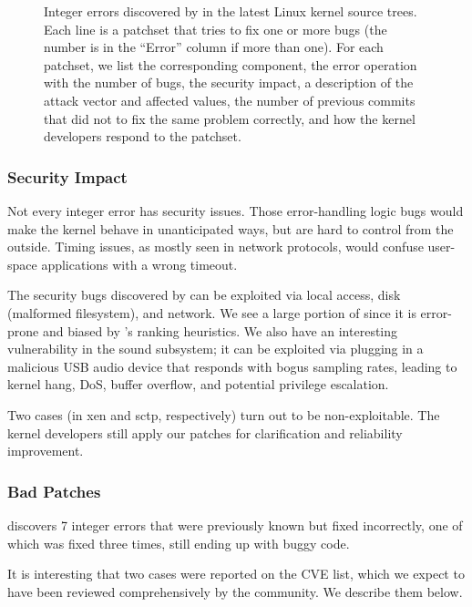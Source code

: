 \begin{figure*}
\centering
\footnotesize

\caption{Integer errors discovered by \sys in the latest Linux
kernel source trees.  Each line is a patchset that tries to fix one
or more bugs (the number is in the ``Error'' column if more than
one).  For each patchset, we list the corresponding component, the
error operation with the number of bugs, the security impact, a
description of the attack vector and affected values, the number
of previous commits that did not to fix the same problem correctly,
and how the kernel developers respond to the patchset.}
\label{f:data:linux}
\end{figure*}

\subsubsection{Security Impact}

Not every integer error has security issues.  Those error-handling
logic bugs would make the kernel behave in unanticipated ways, but
are hard to control from the outside.  Timing issues, as mostly
seen in network protocols, would confuse user-space applications
with a wrong timeout.

The security bugs discovered by \sys can be exploited via local
access, disk (malformed filesystem), and network.  We see a large
portion of  since it is error-prone and biased by \sys's
ranking heuristics.  We also have an interesting vulnerability in
the sound subsystem; it can be exploited via plugging in a malicious
USB audio device that responds with bogus sampling rates, leading
to kernel hang, DoS, buffer overflow, and potential privilege
escalation.

Two cases (in xen and sctp, respectively) turn out to be non-exploitable.
The kernel developers still apply our patches for clarification and
reliability improvement.

\subsubsection{Bad Patches}

\sys discovers 7 integer errors that were previously known but fixed
incorrectly, one of which was fixed three times, still ending up
with buggy code.

It is interesting that two cases were reported on the CVE list,
which we expect to have been reviewed comprehensively by the
community.  We describe them below.

